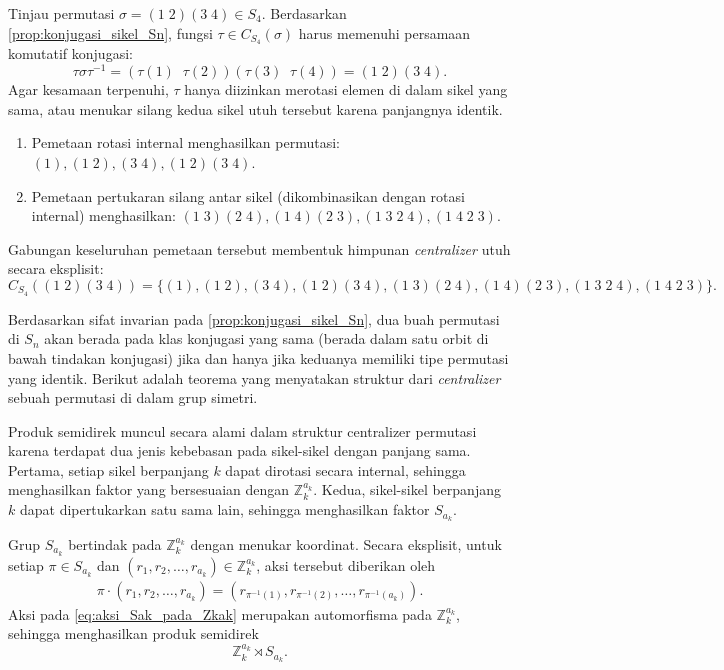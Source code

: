 \begin{contoh}
  Tinjau permutasi $\sigma = (1\;2)(3\;4) \in S_4$. Berdasarkan \autoref{prop:konjugasi_sikel_Sn}, fungsi $\tau \in C_{S_4}(\sigma)$ harus memenuhi persamaan komutatif konjugasi:
  \[
    \tau \sigma \tau^{-1} = (\tau(1)\;\;\tau(2))(\tau(3)\;\;\tau(4)) = (1\;2)(3\;4).
  \]
  Agar kesamaan terpenuhi, $\tau$ hanya diizinkan merotasi elemen di dalam sikel yang sama, atau menukar silang kedua sikel utuh tersebut karena panjangnya identik.
  \begin{enumerate}
    \item Pemetaan rotasi internal menghasilkan permutasi: $(1), (1\;2), (3\;4), (1\;2)(3\;4)$.
    \item Pemetaan pertukaran silang antar sikel (dikombinasikan dengan rotasi internal) menghasilkan: $(1\;3)(2\;4), (1\;4)(2\;3), (1\;3\;2\;4), (1\;4\;2\;3)$.
  \end{enumerate}
  Gabungan keseluruhan pemetaan tersebut membentuk himpunan \emph{centralizer} utuh secara eksplisit:
  \[
    C_{S_4}((1\;2)(3\;4)) = \{ (1), (1\;2), (3\;4), (1\;2)(3\;4), (1\;3)(2\;4), (1\;4)(2\;3), (1\;3\;2\;4), (1\;4\;2\;3) \}.
  \]
\end{contoh}

Berdasarkan sifat invarian pada \autoref{prop:konjugasi_sikel_Sn}, dua buah permutasi di $S_n$ akan berada pada klas konjugasi yang sama (berada dalam satu orbit di bawah tindakan konjugasi) jika dan hanya jika keduanya memiliki tipe permutasi yang identik. Berikut adalah teorema yang menyatakan struktur dari \emph{centralizer} sebuah permutasi di dalam grup simetri.

Produk semidirek muncul secara alami dalam struktur centralizer permutasi karena terdapat dua jenis kebebasan pada sikel-sikel dengan panjang sama. Pertama, setiap sikel berpanjang $k$ dapat dirotasi secara internal, sehingga menghasilkan faktor yang bersesuaian dengan $\mathbb{Z}_k^{a_k}$. Kedua, sikel-sikel berpanjang $k$ dapat dipertukarkan satu sama lain, sehingga menghasilkan faktor $S_{a_k}$.

Grup $S_{a_k}$ bertindak pada $\mathbb{Z}_k^{a_k}$ dengan menukar koordinat. Secara eksplisit, untuk setiap $\pi\in S_{a_k}$ dan $(r_1,r_2,\ldots,r_{a_k})\in \mathbb{Z}_k^{a_k}$, aksi tersebut diberikan oleh
\begin{align}\label{eq:aksi_Sak_pada_Zkak}
  \pi\cdot(r_1,r_2,\ldots,r_{a_k})
  =
  (r_{\pi^{-1}(1)},r_{\pi^{-1}(2)},\ldots,r_{\pi^{-1}(a_k)}).
\end{align}
Aksi pada \eqref{eq:aksi_Sak_pada_Zkak} merupakan automorfisma pada $\mathbb{Z}_k^{a_k}$, sehingga menghasilkan produk semidirek
\[
  \mathbb{Z}_k^{a_k}\rtimes S_{a_k}.
\]

